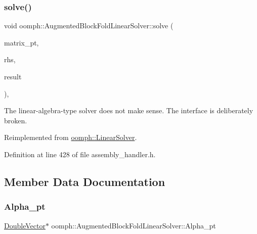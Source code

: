 \subsubsection{\texorpdfstring{solve()}{solve()}\hspace{0.1cm}{\footnotesize\ttfamily [3/3]}}
{\footnotesize\ttfamily void oomph\+::\+Augmented\+Block\+Fold\+Linear\+Solver\+::solve (\begin{DoxyParamCaption}\item[{\hyperlink{classoomph_1_1DoubleMatrixBase}{Double\+Matrix\+Base} $\ast$const \&}]{matrix\+\_\+pt,  }\item[{const \hyperlink{classoomph_1_1Vector}{Vector}$<$ double $>$ \&}]{rhs,  }\item[{\hyperlink{classoomph_1_1Vector}{Vector}$<$ double $>$ \&}]{result }\end{DoxyParamCaption})\hspace{0.3cm}{\ttfamily [inline]}, {\ttfamily [virtual]}}



The linear-\/algebra-\/type solver does not make sense. The interface is deliberately broken. 



Reimplemented from \hyperlink{classoomph_1_1LinearSolver_a1f7a2ee2cd18d3dafc20a61ca2f52dbb}{oomph\+::\+Linear\+Solver}.



Definition at line 428 of file assembly\+\_\+handler.\+h.



\subsection{Member Data Documentation}
\mbox{\label{classoomph_1_1AugmentedBlockFoldLinearSolver_ae4f2e27925a6ceef247bac84f49fdb90}} 
\subsubsection{\texorpdfstring{Alpha\+\_\+pt}{Alpha\_pt}}
{\footnotesize\ttfamily \hyperlink{classoomph_1_1DoubleVector}{Double\+Vector}$\ast$ oomph\+::\+Augmented\+Block\+Fold\+Linear\+Solver\+::\+Alpha\+\_\+pt\hspace{0.3cm}{\ttfamily [private]}}



